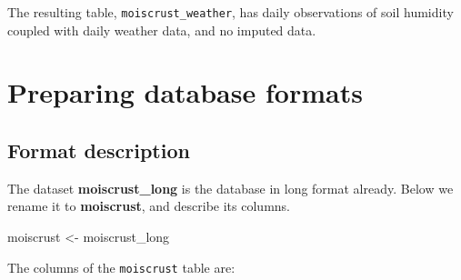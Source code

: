\documentclass[
  table]{article}
\newenvironment{Shaded}{\begin{snugshade}}{\end{snugshade}}
\newcommand{\NormalTok}[1]{#1}
\newcommand{\OtherTok}[1]{\textcolor[rgb]{0.56,0.35,0.01}{#1}}
\begin{document}
The resulting table, \texttt{moiscrust\_weather}, has daily observations
of soil humidity coupled with daily weather data, and no imputed data.

\hypertarget{preparing-database-formats}{%
\section{Preparing database formats}\label{preparing-database-formats}}

\hypertarget{format-description}{%
\subsection{Format description}\label{format-description}}

The dataset \textbf{moiscrust\_long} is the database in long format
already. Below we rename it to \textbf{moiscrust}, and describe its
columns.

\begin{Shaded}
\begin{Highlighting}[]
\NormalTok{moiscrust }\OtherTok{\textless{}{-}}\NormalTok{ moiscrust\_long}
\end{Highlighting}
\end{Shaded}

The columns of the \texttt{moiscrust} table are:
\end{document}
